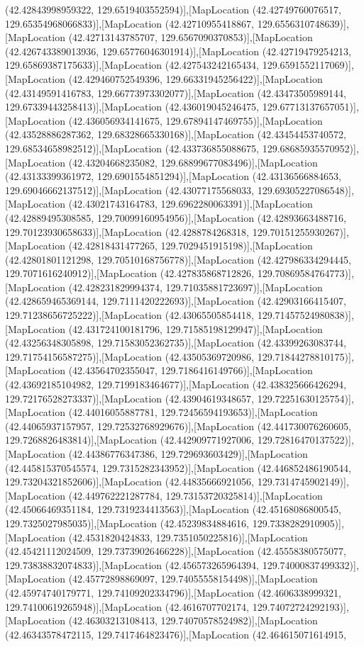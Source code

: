 (42.42843998959322, 129.6519403552594)],[MapLocation (42.42749760076517, 129.65354968066833)],[MapLocation (42.42710955418867, 129.6556310748639)],[MapLocation (42.42713143785707, 129.6567090370853)],[MapLocation (42.426743389013936, 129.65776046301914)],[MapLocation (42.42719479254213, 129.65869387175633)],[MapLocation (42.427543242165434, 129.6591552117069)],[MapLocation (42.429460752549396, 129.66331945256422)],[MapLocation (42.43149591416783, 129.66773973302077)],[MapLocation (42.43473505989144, 129.67339443258413)],[MapLocation (42.436019045246475, 129.67713137657051)],[MapLocation (42.436056934141675, 129.67894147469755)],[MapLocation (42.43528886287362, 129.68328665330168)],[MapLocation (42.43454453740572, 129.68534658982512)],[MapLocation (42.433736855088675, 129.68685935570952)],[MapLocation (42.43204668235082, 129.68899677083496)],[MapLocation (42.43133399361972, 129.6901554851294)],[MapLocation (42.43136566884653, 129.69046662137512)],[MapLocation (42.43077175568033, 129.69305227086548)],[MapLocation (42.43021743164783, 129.6962280063391)],[MapLocation (42.42889495308585, 129.70099160954956)],[MapLocation (42.42893663488716, 129.70123930658633)],[MapLocation (42.4288784268318, 129.70151255930267)],[MapLocation (42.42818431477265, 129.7029451915198)],[MapLocation (42.42801801121298, 129.70510168756778)],[MapLocation (42.427986334294445, 129.7071616240912)],[MapLocation (42.427835868712826, 129.70869584764773)],[MapLocation (42.428231829994374, 129.71035881723697)],[MapLocation (42.428659465369144, 129.7111420222693)],[MapLocation (42.42903166415407, 129.71238656725222)],[MapLocation (42.43065505854418, 129.71457524980838)],[MapLocation (42.431724100181796, 129.71585198129947)],[MapLocation (42.43256348305898, 129.71583052362735)],[MapLocation (42.43399263083744, 129.71754156587275)],[MapLocation (42.43505369720986, 129.71844278810175)],[MapLocation (42.43564702355047, 129.7186416149766)],[MapLocation (42.43692185104982, 129.7199183464677)],[MapLocation (42.438325666426294, 129.72176528273337)],[MapLocation (42.43904619348657, 129.72251630125754)],[MapLocation (42.44016055887781, 129.72456594193653)],[MapLocation (42.44065937157957, 129.72532768929676)],[MapLocation (42.441730076260605, 129.7268826483814)],[MapLocation (42.442909771927006, 129.72816470137522)],[MapLocation (42.44386776347386, 129.729693603429)],[MapLocation (42.445815370545574, 129.7315282343952)],[MapLocation (42.446852486190544, 129.73204321852606)],[MapLocation (42.44835666921056, 129.7314745902149)],[MapLocation (42.449762221287784, 129.73153720325814)],[MapLocation (42.45066469351184, 129.7319234413563)],[MapLocation (42.45168086800545, 129.7325027985035)],[MapLocation (42.45239834884616, 129.7338282910905)],[MapLocation (42.4531820424833, 129.7351050225816)],[MapLocation (42.45421112024509, 129.73739026466228)],[MapLocation (42.45558380575077, 129.73838832074833)],[MapLocation (42.456573265964394, 129.74000837499332)],[MapLocation (42.45772898869097, 129.74055558154498)],[MapLocation (42.45974740179771, 129.74109202334796)],[MapLocation (42.4606338999321, 129.74100619265948)],[MapLocation (42.4616707702174, 129.74072724292193)],[MapLocation (42.46303213108413, 129.74070578524982)],[MapLocation (42.46343578472115, 129.7417464823476)],[MapLocation (42.464615071614915, 
